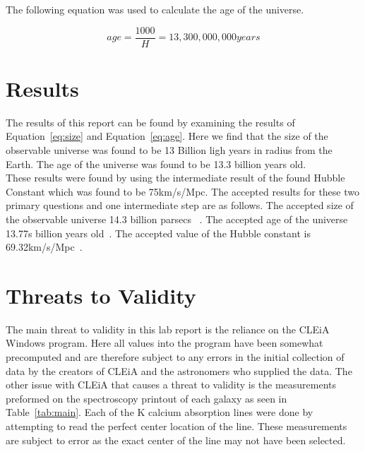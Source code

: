 \documentclass{article}
\begin{document}
The following equation was used to calculate the age of the universe.

\begin{equation}
\label{eq:age}
age = \frac{1000}{H} = 13,300,000,000 years
\end{equation}


\section{Results}

The results of this report can be found by examining the results of 
Equation~\ref{eq:size} and Equation~\ref{eq:age}. Here we find that the size
of the observable universe was found to be 13 Billion ligh years in radius
from the Earth. The age of the universe was found to be 13.3 billion years old.\\

These results were found by using the intermediate result of the found Hubble 
Constant which was found to be 75km/s/Mpc. The accepted results for these two
primary questions and one intermediate step are as follows. The accepted size of
the observable universe 14.3 billion parsecs ~\cite{gott:2005}. 
The accepted age of the universe 13.77s billion years old~\cite{lars:2012}. 
The accepted value
of the Hubble constant is 69.32km/s/Mpc~\cite{WMAP:2012}.


\section{Threats to Validity}

The main threat to validity in this lab report is the reliance on the CLEiA Windows
program. Here all values into the program have been somewhat precomputed and are therefore
subject to any errors in the initial collection of data by the creators of CLEiA and the
astronomers who supplied the data. The other issue with CLEiA that causes a threat to
validity is the measurements preformed on the spectroscopy printout of each galaxy
as seen in Table~\ref{tab:main}. Each of the K calcium absorption lines were done
by attempting to read the perfect center location of the line. These measurements
are subject to error as the exact center of the line may not have been selected.\\
\end{document}
